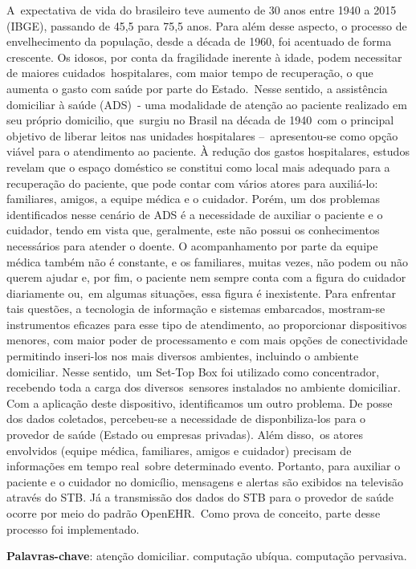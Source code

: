 \setlength{\absparsep}{18pt} %
\begin{resumo}

A expectativa de vida do brasileiro teve aumento de 30 anos entre 1940 a 2015
(IBGE), passando de 45,5 para 75,5 anos. Para além desse aspecto, o processo de
envelhecimento da população, desde a década de 1960, foi acentuado de forma
crescente. Os idosos, por conta da fragilidade inerente à idade, podem
necessitar de maiores cuidados hospitalares, com maior tempo de recuperação, o
que aumenta o gasto com saúde por parte do Estado. Nesse sentido, a assistência
domiciliar à saúde (ADS) - uma modalidade de atenção ao paciente realizado em
seu próprio domicilio, que surgiu no Brasil na década de 1940 com o principal
objetivo de liberar leitos nas unidades hospitalares – apresentou-se como opção
viável para o atendimento ao paciente. À redução dos gastos hospitalares,
estudos revelam que o espaço doméstico se constitui como local mais adequado
para a recuperação do paciente, que pode contar com vários atores 
para auxiliá-lo:  familiares, amigos, a equipe médica e o cuidador. 
Porém, um dos problemas identificados nesse cenário de ADS é a necessidade de
auxiliar o paciente e o cuidador, tendo em vista que, geralmente, este não
possui os conhecimentos necessários para atender o doente. O acompanhamento por
parte da equipe médica também não é constante, e os familiares, muitas vezes,
não podem ou não querem ajudar e, por fim, o paciente nem sempre conta com a
figura do cuidador diariamente ou, em algumas situações, essa figura é
inexistente. Para enfrentar tais questões, a tecnologia de informação e sistemas
embarcados, mostram-se instrumentos eficazes para esse tipo de atendimento, ao
proporcionar dispositivos menores, com maior poder de processamento e com mais
opções de conectividade permitindo inseri-los nos mais diversos ambientes,
incluindo o ambiente domiciliar. Nesse sentido, um Set-Top Box foi utilizado
como concentrador, recebendo toda a carga dos diversos sensores instalados no
ambiente domiciliar. Com a aplicação deste dispositivo, identificamos um outro
problema. De posse dos dados coletados, percebeu-se a necessidade de
disponbiliza-los para o provedor de saúde (Estado ou empresas privadas). Além
disso, os atores envolvidos (equipe médica, familiares, amigos e cuidador)
precisam de informações em tempo real sobre determinado evento. Portanto, para
auxiliar o paciente e o cuidador no domicílio, mensagens e alertas são exibidos
na televisão através do STB. Já a transmissão dos dados do STB para o provedor
de saúde ocorre por meio do padrão OpenEHR. Como prova de conceito, parte desse
processo foi implementado.

 \textbf{Palavras-chave}: atenção domiciliar. computação ubíqua. computação pervasiva.
 \end{resumo}
